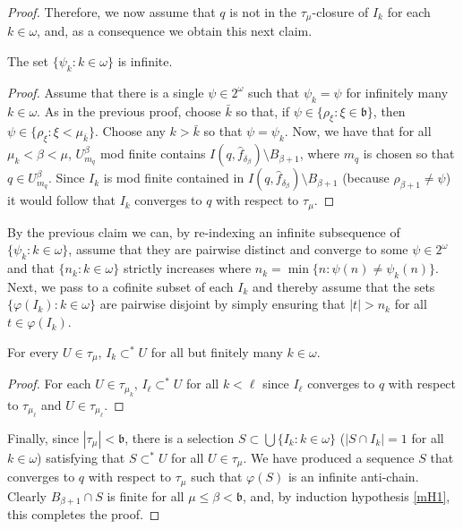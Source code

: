 \documentclass[10pt,a4paper]{amsart}
\begin{document}
\begin{proof}
  Therefore, we now assume that $q$ is not in the $\tau_\mu$-closure
  of $I_k$ for each $k\in \omega$, and, as a consequence we obtain
  this next claim.

  \begin{claim} The
  set $\{ \psi_k : k\in\omega\}$ is infinite.
  \end{claim}

  \begin{proof} Assume that there is a single $\psi\in 2^\omega$
  such that $\psi_k = \psi$ for infinitely many $k\in \omega$. 
  As in the previous proof, choose $\bar k$ so that, if 
   $\psi \in \{\rho_\xi : \xi\in\mathfrak b\}$, then
      $\psi \in \{ \rho_\xi : \xi < \mu_{\bar k}\}$. 
   Choose any $k >\bar k$ so that $\psi = \psi_k$. Now, 
   we have that for all $\mu_{ k} < \beta < \mu$,
   $U^\beta_{m_q} $ mod finite contains
    $ I(q,\hat f_{\delta_\beta}) \setminus B_{\beta+1}$, 
    where $m_q$ is chosen so that $q\in U^\beta_{m_q}$. 
    Since $I_k$ is mod finite contained in 
       $I(q,\hat f_{\delta_\beta})\setminus B_{\beta+1}$
       (because $\rho_{\beta+1}\neq \psi$) 
       it would follow that $I_k$ converges to $q$ with 
        respect to $\tau_\mu$.
  \end{proof}

By the previous claim we can, by re-indexing an infinite subsequence
 of $\{ \psi_k : k\in \omega\}$, assume that they are pairwise
 distinct and converge to some $\psi\in 2^\omega$ and that
    $\{ n_k : k\in\omega\}$ strictly increases where
     $n_k = \min\{ n : \psi(n)\neq \psi_k(n)\}$. 
  Next, we pass
 to a cofinite subset of each $I_k$ and thereby assume that
 the sets  $\{ \varphi(I_k) : k\in \omega\}$ are pairwise disjoint
 by simply ensuring that $|t|>n_k$ for all $ t\in \varphi(I_k)$.


 \begin{claim} For every $U\in \tau_\mu$, $I_k\subset^* U$ for all
 but finitely many $k\in \omega$.
 \end{claim}

 \begin{proof}  For each $U\in \tau_{\mu_k}$, $I_\ell\subset ^* U$
 for all $k<\ell$ since $I_\ell$ converges to $q$ with respect
 to $\tau_{\mu_\ell}$ and $U\in \tau_{\mu_\ell}$. 
 \end{proof}


  \egroup

  Finally, since $|\tau_\mu|<\mathfrak b$, there is a selection 
   $S\subset \bigcup\{ I_k : k\in \omega\}$  ($|S\cap I_k| = 1$
   for all $k\in \omega$)  satisfying that 
    $S\subset^* U$ for all $U\in \tau_\mu$.
We have produced a sequence $S$ that converges to $q$ with respect
to $\tau_\mu$ such that $\varphi(S)$ is an infinite anti-chain.
Clearly $B_{\beta+1}\cap S$ is finite for all $\mu\leq\beta<\mathfrak b$,
 and, by induction hypothesis \ref{mH1}, this completes the proof.
\end{proof}
\end{document}
